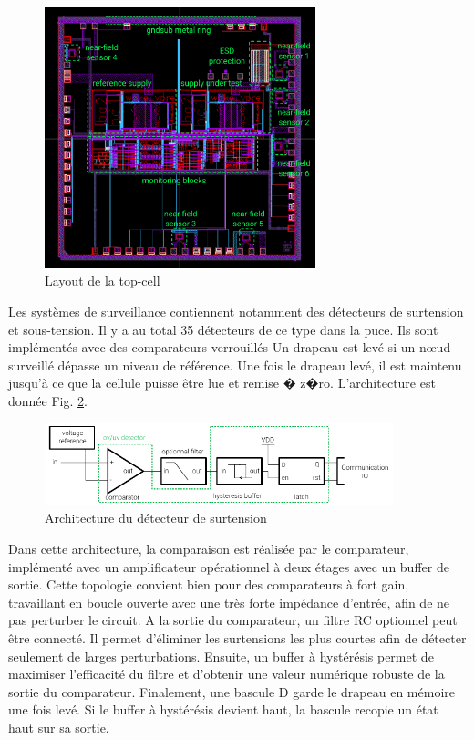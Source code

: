 \begin{figure}[!h]
  \centering
  \includegraphics[width=0.7\textwidth]{src/1/figures/topcell_layout.pdf}
  \caption{Layout de la top-cell}
  \label{fig:top-cell-layout}
\end{figure}

Les systèmes de surveillance contiennent notamment des détecteurs de surtension et sous-tension.
Il y a au total 35 détecteurs de ce type dans la puce.
Ils sont implémentés avec des comparateurs verrouillés
Un drapeau est levé si un nœud surveillé dépasse un niveau de référence.
Une fois le drapeau levé, il est maintenu jusqu'à ce que la cellule puisse être lue et remise � z�ro.
L'architecture est donnée Fig. \ref{fig:architecture-ov}.

\begin{figure}[!h]
  \centering
  \includegraphics[width=0.9\textwidth]{src/1/figures/architecture_OV.pdf}
  \caption{Architecture du détecteur de surtension}
  \label{fig:architecture-ov}
\end{figure}

Dans cette architecture, la comparaison est réalisée par le comparateur, implémenté avec un amplificateur opérationnel à deux étages avec un buffer de sortie.
Cette topologie convient bien pour des comparateurs à fort gain, travaillant en boucle ouverte avec une très forte impédance d'entrée, afin de ne pas perturber le circuit.
A la sortie du comparateur, un filtre RC optionnel peut être connecté.
Il permet d'éliminer les surtensions les plus courtes afin de détecter seulement de larges perturbations.
Ensuite, un buffer à hystérésis permet de maximiser l'efficacité du filtre et d'obtenir une valeur numérique robuste de la sortie du comparateur.
Finalement, une bascule D garde le drapeau en mémoire une fois levé.
Si le buffer à hystérésis devient haut, la bascule recopie un état haut sur sa sortie.

